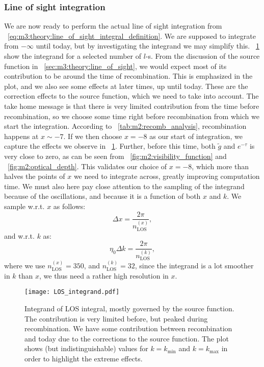    \subsubsection{Line of sight integration}
        We are now ready to perform the actual line of sight integration from ~\cref{eq:m3:theory:line_of_sight_integral_definition}. We are supposed to integrate from $-\infty$ until today, but by investigating the integrand we may simplify this. ~\cref{fig:m4:LOS_integrand} show the integrand for a selected number of $l$-s. From the discussion of the source function in ~\cref{sec:m3:theory:line_of_sight}, we would expect most of its contribution to be around the time of recombination. This is emphasized in the plot, and we also see some effects at later times, up until today. These are the correction effects to the source function, which we need to take into account. The take home message is that there is very limited contribution from the time before recombination, so we choose some time right before recombination from which we start the integration. According to ~\cref{tab:m2:recomb_analysis}, recombination happens at $x\sim -7$. If we then choose $x=-8$ as our start of integration, we capture the effects we observe in ~\cref{fig:m4:LOS_integrand}. Further, before this time, both $\tilde{g}$ and $e^{-\tau}$ is very close to zero, as can be seen from ~\cref{fig:m2:visibility_function} and ~\cref{fig:m2:optical_depth}. This validates our choice of $x=-8$, which more than halves the points of $x$ we need to integrate across, greatly improving computation time. We must also here pay close attention to the sampling of the integrand because of the oscillations, and because it is a function of both $x$ and $k$. We sample w.r.t. $x$ as follows:
        \begin{equation}
            \Delta x = \frac{2\pi}{n_\mathrm{LOS}^{(x)}},
        \end{equation}
        and w.r.t. $k$ as:
        \begin{equation}
            \eta_0\Delta k = \frac{2\pi}{n_\mathrm{LOS}^{(k)}},
        \end{equation}
        where we use $n_\mathrm{LOS}^{(x)}=350$, and $n_\mathrm{LOS}^{(k)}=32$, since the integrand is a lot smoother in $k$ than $x$, we thus need a rather high resolution in $x$. 

        \begin{figure}
            \texttt{[image: LOS\_integrand.pdf]}
            \caption{Integrand of LOS integral, mostly governed by the source function. The contribution is very limited before, but peaked during recombination. We have some contribution between recombination and today due to the corrections to the source function. The plot shows (but indistinguishable) values for $k=k_\mathrm{min}$ and $k=k_\mathrm{max}$ in order to highlight the extreme effects.}
            \label{fig:m4:LOS_integrand}
        \end{figure}

